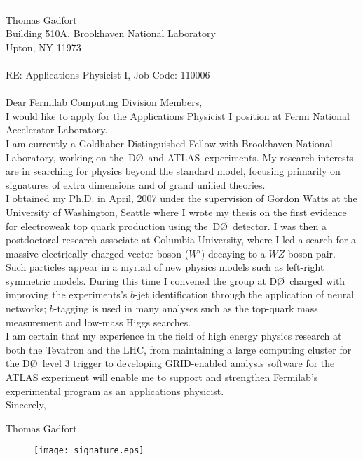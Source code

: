 \documentclass[12pt]{article}
\newcommand{\dzero}{D\O}
\begin{document}
\textcolor{white}{m}\\
Thomas Gadfort \\
Building 510A, Brookhaven National Laboratory \\
Upton, NY 11973 \\
\\

\noindent
RE: Applications Physicist I, Job Code: 110006 \\
\\

\noindent
Dear Fermilab Computing Division Members,\\

I would like to apply for the Applications Physicist I position at Fermi National Accelerator Laboratory.\\

I am currently a Goldhaber Distinguished Fellow with Brookhaven National Laboratory, working on the~\dzero~and ATLAS~experiments. My research interests are in  searching for physics beyond the standard model, focusing primarily on signatures of extra dimensions and  of grand unified theories.\\

I obtained my Ph.D. in April, 2007 under the supervision of Gordon Watts at the University of Washington, Seattle where I wrote my thesis on the first evidence for electroweak top quark production using the~\dzero\ detector. I was then a postdoctoral research associate at Columbia University, where I led a search for a massive electrically charged vector boson ($W'$) decaying to a $WZ$ boson pair.  Such particles appear in a myriad of new physics models such as left-right symmetric models.  During this time I convened the group at \dzero~charged with improving the experiments's $b$-jet identification through the application of neural networks;  $b$-tagging is used in many analyses such as the top-quark mass measurement and low-mass Higgs searches.\\

I am certain that my experience in the field of high energy physics research at both the Tevatron and the LHC, from maintaining a large computing cluster for the \dzero~level 3 trigger to developing GRID-enabled analysis software for the ATLAS experiment will enable me to support and strengthen Fermilab's experimental program as an applications physicist. \\



\noindent
Sincerely,


Thomas Gadfort
\vspace{-0.15in}
\begin{figure}[!h!tbp]
\texttt{[image: signature.eps]}
\end{figure}
\end{document}
